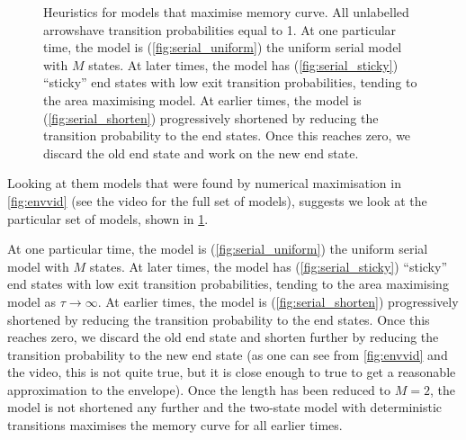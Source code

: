 \documentclass[12pt]{article}
\begin{document}
\begin{figure}[tb]
  \centering
  \begin{myenuma}
    \item{}\hspace{0.02\linewidth}\label{fig:serial_uniform}
    \item{}\hspace{0.02\linewidth}\label{fig:serial_sticky}
    \item{}\label{fig:serial_shorten}
  \end{myenuma}
  \caption[Heuristic optimal models]{Heuristics for models that maximise memory curve.
  All unlabelled arrowshave transition probabilities equal to 1.
  At one particular time, the model is (\ref{fig:serial_uniform}) the uniform serial model with \(M\) states.
  At later times, the model has (\ref{fig:serial_sticky}) ``sticky'' end states with low exit transition probabilities, tending to the area maximising model.
  At earlier times, the model is (\ref{fig:serial_shorten}) progressively shortened by reducing the transition probability to the end states.
  Once this reaches zero, we discard the old end state and work on the new end state.} \label{fig:heuristicmodels}
\end{figure}


Looking at them models that were found by numerical maximisation in \cref{fig:envvid} (see the video for the full set of models), suggests we look at the particular set of models, shown in \cref{fig:heuristicmodels}.

At one particular time, the model is (\ref{fig:serial_uniform}) the uniform serial model with \(M\) states.
At later times, the model has (\ref{fig:serial_sticky}) ``sticky'' end states with low exit transition probabilities, tending to the area maximising model as \(\tau \to \infty\).
At earlier times, the model is (\ref{fig:serial_shorten}) progressively shortened by reducing the transition probability to the end states.
Once this reaches zero, we discard the old end state and shorten further by reducing the transition probability to the new end state (as one can see from \cref{fig:envvid} and the video, this is not quite true, but it is close enough to true to get a reasonable approximation to the envelope).
Once the length has been reduced to \(M=2\), the model is not shortened any further and the two-state model with deterministic transitions maximises the memory curve for all earlier times.
\end{document}
